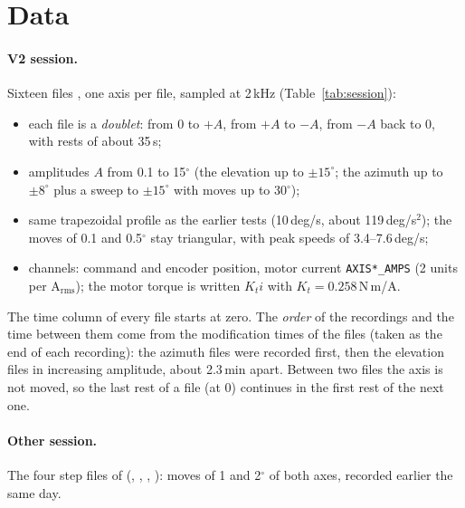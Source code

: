 \documentclass[10pt,a4paper]{article}
\numberwithin{equation}{section}
\begin{document}
\tableofcontents

\section{Data}\label{sec:data}
\paragraph{V2 session.} Sixteen files , one axis per file, sampled at 2\,kHz (Table~\ref{tab:session}):
\begin{itemize}
\item each file is a \emph{doublet}: from 0 to $+A$, from $+A$ to $-A$, from $-A$ back to 0, with rests of about 35\,s;
\item amplitudes $A$ from 0.1 to 15$^\circ$ (the elevation up to $\pm15^\circ$; the azimuth up to $\pm8^\circ$ plus a sweep to $\pm15^\circ$ with moves up to 30$^\circ$);
\item same trapezoidal profile as the earlier tests (10\,deg/s, about 119\,deg/s$^2$); the moves of 0.1 and 0.5$^\circ$ stay triangular, with peak speeds of 3.4--7.6\,deg/s;
\item channels: command and encoder position, motor current \texttt{AXIS*\_AMPS} (2 units per A$_\mathrm{rms}$); the motor torque is written $K_t i$ with $K_t=0.258$\,N\,m/A.
\end{itemize}
The time column of every file starts at zero. The \emph{order} of the recordings and the time between them come from the modification times of the files (taken as the end of each recording): the azimuth files were recorded first, then the elevation files in increasing amplitude, about 2.3\,min apart. Between two files the axis is not moved, so the last rest of a file (at 0) continues in the first rest of the next one.

\paragraph{Other session.} The four step files of  (, , , ): moves of 1 and 2$^\circ$ of both axes, recorded earlier the same day.
\end{document}
